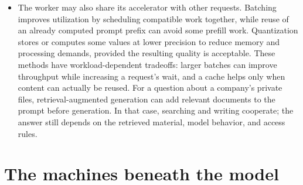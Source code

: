\documentclass[10pt]{article}
\begin{document}
\begin{itemize}[leftmargin=1.25em, itemsep=0.3em, parsep=0pt, topsep=0pt]
    \item The worker may also share its accelerator with other requests. Batching improves utilization by scheduling compatible work together, while reuse of an already computed prompt prefix can avoid some prefill work. Quantization stores or computes some values at lower precision to reduce memory and processing demands, provided the resulting quality is acceptable. These methods have workload-dependent tradeoffs: larger batches can improve throughput while increasing a request's wait, and a cache helps only when content can actually be reused. For a question about a company's private files, retrieval-augmented generation can add relevant documents to the prompt before generation. In that case, searching and writing cooperate; the answer still depends on the retrieved material, model behavior, and access rules.
\end{itemize}

\newpage
\section*{The machines beneath the model}
\end{document}

